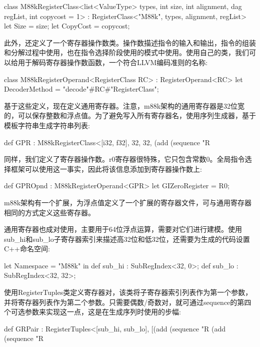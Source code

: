 \begin{cpp}
class M88kRegisterClass<list<ValueType> types, int size,
                        int alignment, dag regList,
                        int copycost = 1>
    : RegisterClass<"M88k", types, alignment, regList> {
    let Size = size;
    let CopyCost = copycost;
}
\end{cpp}

此外，还定义了一个寄存器操作数类。操作数描述指令的输入和输出，指令的组装和分解过程中使用，也在指令选择阶段使用的模式中使用。使用自己的类，我们可以给用于解码寄存器操作数函数，一个符合LLVM编码准则的名称:

\begin{cpp}
class M88kRegisterOperand<RegisterClass RC>
: RegisterOperand<RC> {
    let DecoderMethod = "decode"#RC#"RegisterClass";
}
\end{cpp}

基于这些定义，现在定义通用寄存器。注意，m88k架构的通用寄存器是32位宽的，可以保存整数和浮点值。为了避免写入所有寄存器名，使用序列生成器，基于模板字符串生成字符串列表:

\begin{cpp}
def GPR : M88kRegisterClass<[i32, f32], 32, 32,
                            (add (sequence "R%
\end{cpp}

同样，我们定义了寄存器操作数。r0寄存器很特殊，它只包含常数0。全局指令选择框架可以使用这一事实，因此将该信息添加到寄存器操作数上:

\begin{cpp}
def GPROpnd : M88kRegisterOperand<GPR> {
    let GIZeroRegister = R0;
}
\end{cpp}

m88k架构有一个扩展，为浮点值定义了一个扩展的寄存器文件，可与通用寄存器相同的方式定义这些寄存器。

通用寄存器也成对使用，主要用于64位浮点运算，需要对它们进行建模。使用sub\_hi和sub\_lo子寄存器索引来描述高32位和低32位，还需要为生成的代码设置C++命名空间:

\begin{cpp}
let Namespace = "M88k" in {
    def sub_hi : SubRegIndex<32, 0>;
    def sub_lo : SubRegIndex<32, 32>;
}
\end{cpp}

使用RegisterTuples类定义寄存器对，该类将子寄存器索引列表作为第一个参数，并将寄存器列表作为第二个参数。只需要偶数/奇数对，就可通过sequence的第四个可选参数来实现这一点，这是在生成序列时使用的步幅:

\begin{cpp}
def GRPair : RegisterTuples<[sub_hi, sub_lo],
                            [(add (sequence "R%
                            (add (sequence "R%
\end{cpp}


